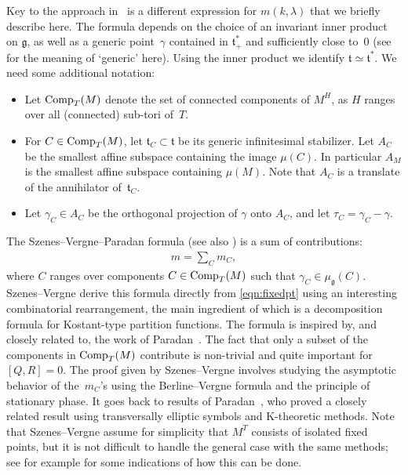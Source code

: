 \documentclass[pdftex]{sigma}
\numberwithin{equation}{section}
\newcommand{\tn}[1]{\textnormal{#1}}
\def\g{\ensuremath{\mathfrak{g}}}
\def\t{\ensuremath{\mathfrak{t}}}
\begin{document}
Key to the approach in~\cite{SzenesVergne2010} is a different expression for $m(k,\lambda)$ that we briefly describe here. The formula depends on the choice of an invariant inner product on $\g$, as well as a generic point~$\gamma$ contained in $\t^\ast_+$ and sufficiently close to~$0$ (see~\cite[Section~4.1]{SzenesVergne2010} for the meaning of `generic' here). Using the inner product we identify $\t \simeq \t^\ast$. We need some additional notation:
\begin{itemize}\itemsep=0pt
\item Let $\tn{Comp}_T(M)$ denote the set of connected components of $M^H$, as $H$ ranges over all (connected) sub-tori of~$T$.
\item For $C \in \tn{Comp}_T(M)$, let $\t_C \subset \t$ be its generic infinitesimal stabilizer. Let $A_C$ be the smallest affine subspace containing the image $\mu(C)$. In particular $A_M$ is the smallest affine subspace containing $\mu(M)$. Note that $A_C$ is a translate of the annihilator of~$\t_C$.
\item Let $\gamma_C \in A_C$ be the orthogonal projection of $\gamma$ onto $A_C$, and let $\tau_C=\gamma_C-\gamma$.
\end{itemize}

The Szenes--Vergne--Paradan formula \cite[equation~(39)]{SzenesVergne2010} (see also \cite[Proposition~41, Theorem~48]{SzenesVergne2010}) is a sum of contributions:
\begin{gather}\label{eqn:SzVer}
m=\sum_C m_C,
\end{gather}
where $C$ ranges over components $C \in \tn{Comp}_T(M)$ such that $\gamma_C \in \mu_\g(C)$. Szenes--Vergne derive this formula directly from \eqref{eqn:fixedpt} using an interesting combinatorial rearrangement, the main ingredient of which is a decomposition formula for Kostant-type partition functions. The formula is inspired by, and closely related to, the work of Paradan~\cite{ParadanRiemannRoch}. The fact that only a subset of the components in $\tn{Comp}_T(M)$ contribute is non-trivial and quite important for $[Q,R]=0$. The proof given by Szenes--Vergne involves studying the asymptotic behavior of the~$m_C$'s using the Berline--Vergne formula and the principle of stationary phase. It goes back to results of Paradan~\cite{ParadanRiemannRoch}, who proved a closely related result using transversally elliptic symbols and K-theoretic methods. Note that Szenes--Vergne assume for simplicity that $M^T$ consists of isolated fixed points, but it is not difficult to handle the general case with the same methods; see for example \cite[Section~7]{VerlindeSums} for some indications of how this can be done.
\end{document}
